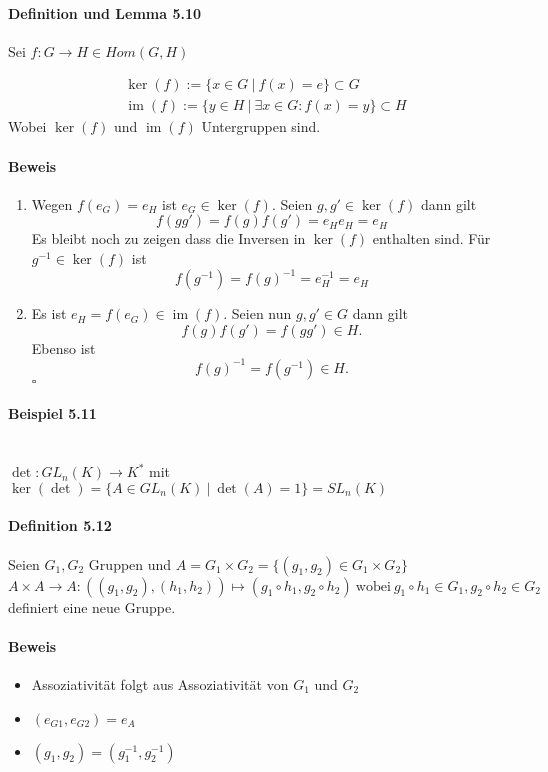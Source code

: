 \documentclass{scrartcl}
\newcommand{\im}{\operatorname{im}}
\begin{document}
\paragraph{Definition und Lemma 5.10}
Sei $f: G \to H \in Hom(G,H)$

\begin{align}
  &\ker(f) := \{x \in G ~|~ f(x) = e\} \subset G \\
  &\im(f) := \{y \in H ~|~ \exists x \in G: f(x) = y\} \subset H
\end{align}
Wobei $\ker(f)$ und $\im(f)$ Untergruppen sind.
\paragraph{Beweis}
\begin{enumerate}{}
  \item Wegen $f(e_G)=e_H$ ist $e_G \in \ker(f)$. Seien $g,g' \in \ker(f)$ dann
    gilt
    \[
      f(gg') = f(g)f(g') = e_He_H = e_H
    \]
    Es bleibt noch zu zeigen dass die Inversen in $\ker(f)$ enthalten sind. Für
    $g^{-1} \in \ker(f)$ ist
    \[
      f(g^{-1}) = f(g)^{-1} = e_H^{-1} = e_H
    \]
  \item Es ist $e_H=f(e_G) \in \im(f)$. Seien nun $g,g' \in G$ dann gilt
    \[
      f(g)f(g') = f(gg') \in H.
    \]
    Ebenso ist
    \[
      f(g)^{-1} = f(g^{-1}) \in H.
    \]
    \hfill $\square$
\end{enumerate}

\paragraph{Beispiel 5.11}
~\\ $\det: GL_n(K) \to K^*$ mit $\ker(\det) = \{A \in GL_n(K) ~|~ \det(A) = 1\} =
SL_n(K)$

\paragraph{Definition 5.12} Seien $G_1, G_2$ Gruppen und $A = G_1 \times G_2 =
\{(g_1,g_2) \in G_1 \times G_2\}$
\[
  A \times A \to A: ((g_1, g_2), (h_1, h_2)) \mapsto (g_1 \circ h_1, g_2 \circ
  h_2) ~\text{wobei}~ g_1 \circ h_1 \in G_1, g_2 \circ h_2 \in G_2
\]
definiert eine neue Gruppe. \\
\paragraph{Beweis}
\begin{itemize}
\item Assoziativität folgt aus Assoziativität von $G_1$ und $G_2$
\item $(e_{G1}, e_{G2}) = e_A$
\item $(g_1, g_2) = (g_1^{-1}, g_2^{-1})$
\end{itemize}
\end{document}
